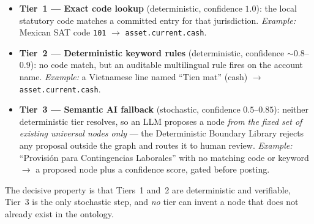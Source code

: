\begin{itemize}
    \item \textbf{Tier~1 --- Exact code lookup} (deterministic, confidence
    $1.0$): the local statutory code matches a committed entry for that
    jurisdiction. \emph{Example:} Mexican SAT code \texttt{101}
    $\rightarrow$ \texttt{asset.current.cash}.
    \item \textbf{Tier~2 --- Deterministic keyword rules} (deterministic,
    confidence $\sim$$0.8$--$0.9$): no code match, but an auditable
    multilingual rule fires on the account name. \emph{Example:} a Vietnamese
    line named ``Tien mat'' (cash) $\rightarrow$
    \texttt{asset.current.cash}.
    \item \textbf{Tier~3 --- Semantic AI fallback} (stochastic, confidence
    $0.5$--$0.85$): neither deterministic tier resolves, so an LLM proposes a
    node \emph{from the fixed set of existing universal nodes only} --- the
    Deterministic Boundary Library rejects any proposal outside the graph and
    routes it to human review. \emph{Example:} ``Provisi\'on para Contingencias
    Laborales'' with no matching code or keyword $\rightarrow$ a proposed node
    plus a confidence score, gated before posting.
\end{itemize}

\noindent The decisive property is that Tiers~1 and~2 are deterministic and
verifiable, Tier~3 is the only stochastic step, and \emph{no} tier can invent a
node that does not already exist in the ontology.
